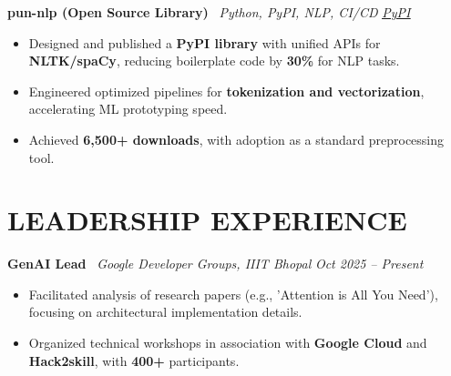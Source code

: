 \documentclass[a4paper,10pt]{article}
\newcommand{\ulhref}[2]{\href{#1}{\uline{#2}}}
\begin{document}


\textbf{pun-nlp (Open Source Library)} \textbar\ \textit{Python, PyPI, NLP, CI/CD} \hfill \textit{\ulhref{https://pypi.org/project/pun-nlp/}{PyPI}}
\begin{itemize}
    \item Designed and published a \textbf{PyPI library} with unified APIs for \textbf{NLTK/spaCy}, reducing boilerplate code by \textbf{30\%} for NLP tasks.
    \item Engineered optimized pipelines for \textbf{tokenization and vectorization}, accelerating ML prototyping speed.
    \item Achieved \textbf{6,500+ downloads}, with adoption as a standard preprocessing tool.
\end{itemize}


\section*{LEADERSHIP EXPERIENCE} %

\textbf{GenAI Lead} \textbar\ \textit{Google Developer Groups, IIIT Bhopal} \hfill \textit{Oct 2025 -- Present}
\begin{itemize}
    \item Facilitated analysis of research papers (e.g., 'Attention is All You Need'), focusing on architectural implementation details.
    \item Organized technical workshops in association with \textbf{Google Cloud} and \textbf{Hack2skill}, with \textbf{400+} participants.
\end{itemize}
\end{document}
